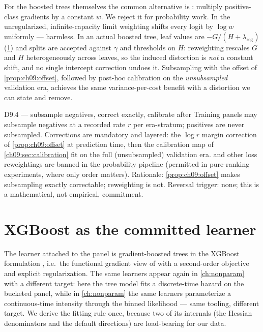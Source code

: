 For the boosted trees themselves the common alternative is
: multiply positive-class gradients by a
constant $w$. We reject it for probability work. In the unregularized,
infinite-capacity limit weighting shifts every logit by $\log w$
uniformly --- harmless. In an actual boosted tree, leaf values are
$-G/(H+\lambda_{\mathrm{reg}})$ (\cref{ch09:sec:xgb}) and splits are
accepted against $\gamma$ and  thresholds on
$H$: reweighting rescales $G$ and $H$ heterogeneously across leaves,
so the induced distortion is \emph{not} a constant shift, and no single
intercept correction undoes it. Subsampling with the offset of
\cref{prop:ch09:offset}, followed by post-hoc calibration on the
\emph{unsubsampled} validation era, achieves the same variance-per-cost
benefit with a distortion we can state and remove.

\begin{decision}{D9.4 --- subsample negatives, correct exactly,
calibrate after}
Training panels may subsample negatives at a recorded rate $r$ per
era-stratum; positives are never subsampled. Corrections are mandatory
and layered: the $\log r$ margin correction of \cref{prop:ch09:offset}
at prediction time, then the calibration map of
\cref{ch09:sec:calibration} fit on the full (unsubsampled) validation
era.  and other loss reweightings are banned in
the probability pipeline (permitted in pure-ranking experiments, where
only order matters). Rationale: \cref{prop:ch09:offset} makes
subsampling exactly correctable; reweighting is not. Reversal trigger:
none; this is a mathematical, not empirical, commitment.
\end{decision}

\section{XGBoost as the committed learner}\label{ch09:sec:xgb}

The learner attached to the panel is gradient-boosted trees in the
XGBoost formulation \citep{chenguestrin2016}, i.e.\ the functional
gradient view of \citet{friedman2001} with a second-order objective and
explicit regularization. The same learners appear again in
\cref{ch:nonparam} with a different target: here the tree model fits a
discrete-time hazard on the bucketed panel, while in \cref{ch:nonparam}
the same learners parameterize a continuous-time intensity through the
binned likelihood --- same tooling, different target. We derive the
fitting rule once, because two of its internals (the Hessian
denominators and the default directions) are load-bearing for our data.

